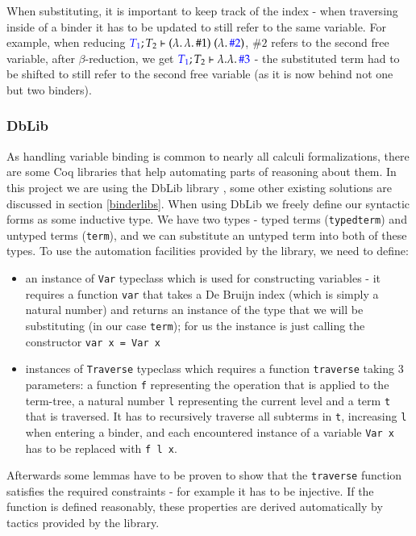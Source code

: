 \documentclass[runningheads]{article}
\begin{document}
When substituting, it is important to keep track of the index - when traversing inside of a binder it has to be updated to still refer to the same variable.
For example, when reducing ${\color{blue}T_1}; T_2 \vdash (\lambda. \, \lambda. \, \#1) \; (\lambda. \, {\color{blue}\#2})$, $\#2$ refers to the second free variable, after $\beta$-reduction, we get ${\color{blue}T_1}; T_2 \vdash \lambda. \lambda. \, {\color{blue}\#3}$ - the substituted term had to be shifted to still refer to the second free variable (as it is now behind not one but two binders).


\subsubsection{DbLib}

As handling variable binding is common to nearly all calculi formalizations, there are some Coq libraries that help automating parts of reasoning about them. In this project we are using the DbLib library \cite{dblib}, some other existing solutions are discussed in section \ref{binderlibs}.
\label{traverse}
When using DbLib we freely define our syntactic forms as some inductive type. We have two types - typed terms (\texttt{typedterm}) and untyped terms (\texttt{term}), and we can substitute an untyped term into both of these types. To use the automation facilities provided by the library, we need to define:
\begin{itemize}
  \item an instance of \texttt{Var} typeclass which is used for constructing variables - it requires a function \texttt{var} that takes a De Bruijn index (which is simply a natural number) and returns an instance of the type that we will be substituting (in our case \texttt{term}); for us the instance is just calling the constructor \texttt{var x = Var x}
  \item instances of \texttt{Traverse} typeclass which requires a function \texttt{traverse} taking 3 parameters: a function \texttt{f} representing the operation that is applied to the term-tree, a natural number \texttt{l} representing the current level and a term \texttt{t} that is traversed. It has to recursively traverse all subterms in \texttt{t}, increasing \texttt{l} when entering a binder, and each encountered instance of a variable \texttt{Var x} has to be replaced with \texttt{f l x}.
\end{itemize}
Afterwards some lemmas have to be proven to show that the \texttt{traverse} function satisfies the required constraints - for example it has to be injective. If the function is defined reasonably, these properties are derived automatically by tactics provided by the library.
\end{document}
